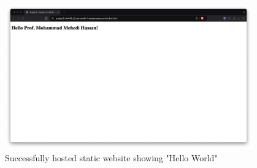 \documentclass[a4paper,12pt]{article}
\begin{document}
\begin{figure}[H]
    \centering
    \includegraphics[width=0.95\textwidth]{host-static-website-13.png}
    \caption{Successfully hosted static website showing "Hello World"}
    \label{fig:static13}
\end{figure}
\end{document}
